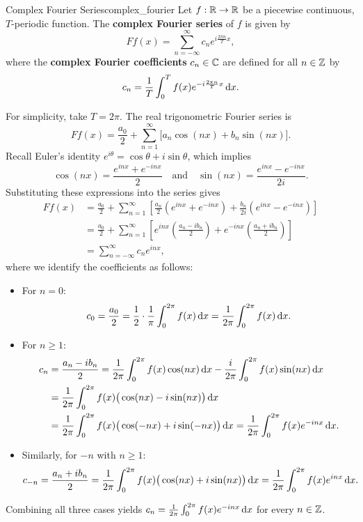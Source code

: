 \begin{definition}{Complex Fourier Series}{complex_fourier}
    Let $f : \mathbb{R} \to \mathbb{R}$ be a piecewise continuous, $T$-periodic function. The \textbf{complex Fourier series} of $f$ is given by
    \[
        Ff(x) = \sum_{n=-\infty}^{\infty} c_n e^{i \frac{2\pi n}{T} x},
    \]
    where the \textbf{complex Fourier coefficients} $c_n \in \mathbb{C}$ are defined for all $n \in \mathbb{Z}$ by
    \[
        c_n = \frac{1}{T} \int_{0}^{T} f(x) e^{-i \frac{2\pi n}{T} x} \,\mathrm{d}x.
    \]
\end{definition}

\begin{demonstration}[Derivation for $T = 2\pi$]
    For simplicity, take $T = 2\pi$. The real trigonometric Fourier series is
    \[
        Ff(x) = \frac{a_0}{2} + \sum_{n=1}^{\infty} \big[ a_n \cos(nx) + b_n \sin(nx) \big].
    \]
    Recall Euler's identity $e^{i\theta} = \cos\theta + i\sin\theta$, which implies
    \[
        \cos(nx) = \frac{e^{inx} + e^{-inx}}{2} \quad \text{and} \quad \sin(nx) = \frac{e^{inx} - e^{-inx}}{2i}.
    \]
    Substituting these expressions into the series gives
    \begin{align*}
        Ff(x) &= \frac{a_0}{2} + \sum_{n=1}^{\infty} \left[ \frac{a_n}{2} \left(e^{inx} + e^{-inx}\right) + \frac{b_n}{2i} \left(e^{inx} - e^{-inx}\right) \right] \\
              &= \frac{a_0}{2} + \sum_{n=1}^{\infty} \left[ e^{inx} \left(\frac{a_n - ib_n}{2}\right) + e^{-inx} \left(\frac{a_n + ib_n}{2}\right) \right] \\
              &= \sum_{n=-\infty}^{\infty} c_n e^{inx},
    \end{align*}
    where we identify the coefficients as follows:
    \begin{itemize}
        \item For $n = 0$:
        \[
            c_0 = \frac{a_0}{2} = \frac{1}{2} \cdot \frac{1}{\pi} \int_{0}^{2\pi} f(x) \,\mathrm{d}x = \frac{1}{2\pi} \int_{0}^{2\pi} f(x) \,\mathrm{d}x.
        \]
        \item For $n \ge 1$:
        \begin{align*}
            c_n &= \frac{a_n - i b_n}{2} = \frac{1}{2\pi} \int_{0}^{2\pi} f(x) \cos(nx) \,\mathrm{d}x - \frac{i}{2\pi} \int_{0}^{2\pi} f(x) \sin(nx) \,\mathrm{d}x \\
                &= \frac{1}{2\pi} \int_{0}^{2\pi} f(x) \big(\cos(nx) - i\sin(nx)\big) \,\mathrm{d}x \\
                &= \frac{1}{2\pi} \int_{0}^{2\pi} f(x) \big(\cos(-nx) + i\sin(-nx)\big) \,\mathrm{d}x = \frac{1}{2\pi} \int_{0}^{2\pi} f(x) e^{-inx} \,\mathrm{d}x.
        \end{align*}
        \item Similarly, for $-n$ with $n \ge 1$:
        \[
            c_{-n} = \frac{a_n + i b_n}{2} = \frac{1}{2\pi} \int_{0}^{2\pi} f(x) \big(\cos(nx) + i\sin(nx)\big) \,\mathrm{d}x = \frac{1}{2\pi} \int_{0}^{2\pi} f(x) e^{inx} \,\mathrm{d}x.
        \]
    \end{itemize}
    Combining all three cases yields $c_n = \frac{1}{2\pi} \int_{0}^{2\pi} f(x) e^{-inx} \,\mathrm{d}x$ for every $n \in \mathbb{Z}$.
\end{demonstration}

